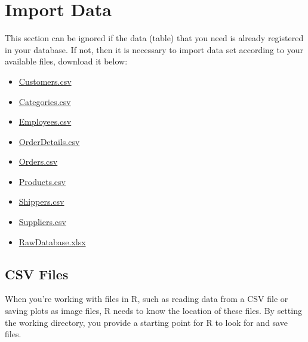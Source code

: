 \documentclass[
]{book}
\providecommand{\tightlist}{%
  \setlength{\itemsep}{0pt}\setlength{\parskip}{0pt}}
\begin{document}
\hypertarget{import-data}{%
\section{Import Data}\label{import-data}}

This section can be ignored if the data (table) that you need is already registered in your database. If not, then it is necessary to import data set according to your available files, download it below:

\begin{itemize}
\tightlist
\item
  \href{https://raw.githubusercontent.com/dsciencelabs/dataset/master/Customers.csv}{Customers.csv}
\item
  \href{https://raw.githubusercontent.com/dsciencelabs/dataset/master/Categories.csv}{Categories.csv}
\item
  \href{https://raw.githubusercontent.com/dsciencelabs/dataset/master/Employees.csv}{Employees.csv}
\item
  \href{https://raw.githubusercontent.com/dsciencelabs/dataset/master/OrderDetails.csv}{OrderDetails.csv}\\
\item
  \href{https://raw.githubusercontent.com/dsciencelabs/dataset/master/Orders.csv}{Orders.csv}
\item
  \href{https://raw.githubusercontent.com/dsciencelabs/dataset/master/Products.csv}{Products.csv}
\item
  \href{https://raw.githubusercontent.com/dsciencelabs/dataset/master/Shippers.csv}{Shippers.csv}
\item
  \href{https://raw.githubusercontent.com/dsciencelabs/dataset/master/Suppliers.csv}{Suppliers.csv}
\item
  \href{https://view.officeapps.live.com/op/view.aspx?src=https\%3A\%2F\%2Fraw.githubusercontent.com\%2Fdsciencelabs\%2Fdataset\%2Fmaster\%2FRawDatabase.xlsx\&wdOrigin=BROWSELINK}{RawDatabase.xlsx}
\end{itemize}

\hypertarget{csv-files}{%
\subsection{CSV Files}\label{csv-files}}

When you're working with files in R, such as reading data from a CSV file or saving plots as image files, R needs to know the location of these files. By setting the working directory, you provide a starting point for R to look for and save files.
\end{document}
